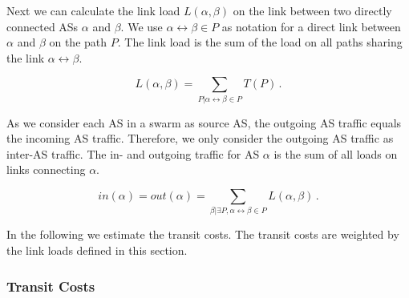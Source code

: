 Next we can calculate the link load $L(\alpha,\beta)$ on the link between two directly connected ASs $\alpha$ and $\beta$. We use $\alpha\leftrightarrow \beta \in P$ as notation for a direct link between $\alpha$ and $\beta$ on the path $P$. The link load is the sum of the load on all paths sharing the link $\alpha\leftrightarrow\beta$.

\begin{equation}\label{equ:linkload}
L(\alpha,\beta)=\sum_{P|\alpha\leftrightarrow \beta \in P} T(P) \, .
\end{equation}

As we consider each AS in a swarm as source AS, the outgoing AS traffic equals the incoming AS traffic. Therefore, we only consider the outgoing AS traffic as inter-AS traffic. The in- and outgoing traffic for AS $\alpha$ is the sum of all loads on links connecting $\alpha$.

\begin{equation}\label{equ:outgoing}
in(\alpha) = out(\alpha) = \sum_{\beta| \exists P, \alpha\leftrightarrow \beta \in P} L(\alpha,\beta) \, .
\end{equation}

In the following we estimate the transit costs. The transit costs are weighted by the link loads defined in this section.



\subsubsection{Transit Costs}

